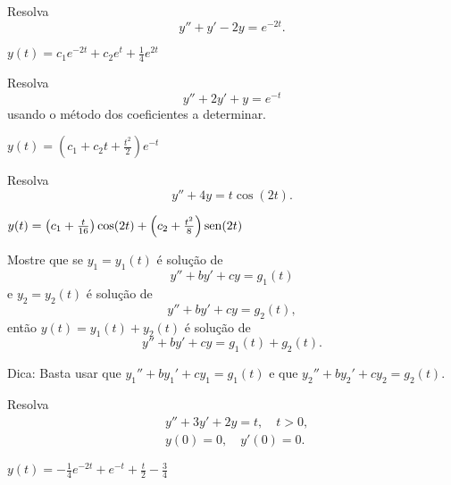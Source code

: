 \begin{exer}
  Resolva
  \begin{equation}
    y'' + y' - 2y = e^{-2t}.
  \end{equation}
\end{exer}
\begin{resp}
  $y(t) = c_1e^{-2t} + c_2e^t + \frac{1}{4}e^{2t}$
\end{resp}

\begin{exer}
  Resolva
  \begin{equation}
    y'' + 2y' + y = e^{-t}
  \end{equation}
  usando o método dos coeficientes a determinar.
\end{exer}
\begin{resp}
  $y(t) = \left(c_1 + c_2t + \frac{t^2}{2}\right)e^{-t}$
\end{resp}

\begin{exer}
  Resolva
  \begin{equation}
    y'' + 4y = t\cos(2t).
  \end{equation}
\end{exer}
\begin{resp}
  $y(t) = \left(c_1 + \frac{t}{16}\right)\cos(2t) + \left(c_2 + \frac{t^2}{8}\right)\operatorname{sen}(2t)$
\end{resp}

\begin{exer}
  Mostre que se $y_1 = y_1(t)$ é solução de
  \begin{equation}
    y'' + by' + cy = g_1(t)
  \end{equation}
  e $y_2 = y_2(t)$ é solução de
  \begin{equation}
    y'' + by' + cy = g_2(t),
  \end{equation}
  então $y(t) = y_1(t) + y_2(t)$ é solução de
  \begin{equation}
    y'' + by' + cy = g_1(t) + g_2(t).
  \end{equation}
\end{exer}
\begin{resp}
  Dica: Basta usar que $y_1''+by_1'+cy_1=g_1(t)$ e que $y_2''+by_2'+cy_2=g_2(t)$.
\end{resp}

\begin{exer}
  Resolva
  \begin{align}
    &y'' + 3y' + 2y = t,\quad t>0,\\
    &y(0)=0,\quad y'(0)=0.
  \end{align}
\end{exer}
\begin{resp}
  $y(t) = -\frac{1}{4}e^{-2t} + e^{-t} + \frac{t}{2} - \frac{3}{4}$
\end{resp}

